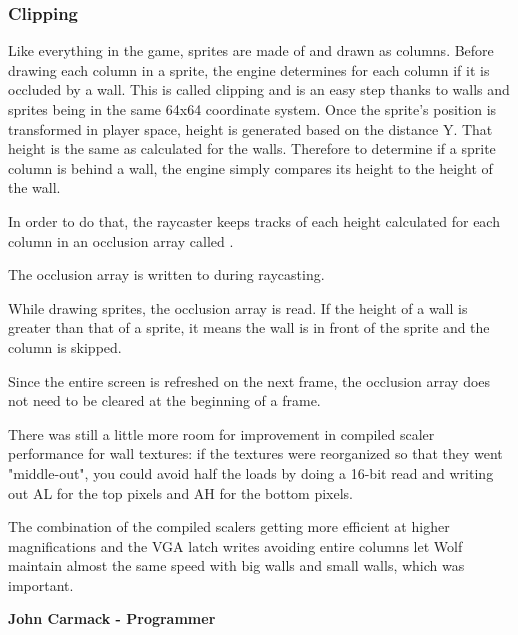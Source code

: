 \subsubsection{Clipping}
Like everything in the game, sprites are made of and drawn as columns. Before drawing each column in a sprite, the engine determines for each column if it is occluded by a wall. This is called clipping and is an easy step thanks to walls and sprites being in the same 64x64 coordinate system. Once the sprite's position is transformed in player space, height is generated based on the distance Y. That height is the same as calculated for the walls. Therefore to determine if a sprite column is behind a wall, the engine simply compares its height to the height of the wall.\\
\par
In order to do that, the raycaster keeps tracks of each height calculated for each column in an occlusion array called .\\
\par
\begin{minipage}{\textwidth}

\end{minipage}
\par
The occlusion array is written to during raycasting.\\
\par
\begin{minipage}{\textwidth}

\end{minipage}
While drawing sprites, the occlusion array is read. If the height of a wall is greater than that of a sprite, it means the wall is in front of the sprite and the column is skipped.\\
\par
\begin{minipage}{\textwidth}

\end{minipage}
\par
Since the entire screen is refreshed on the next frame, the occlusion array does not need to be cleared at the beginning of a frame.\\


\begin{fancyquotes}
There was still a little more room for improvement in compiled scaler performance for wall textures:  if the textures were reorganized so that they went "middle-out", you could avoid half the loads by doing a 16-bit read and writing out AL for the top pixels and AH for the bottom pixels.\\
\par 
The combination of the compiled scalers getting more efficient at higher magnifications and the VGA latch writes avoiding entire columns let Wolf maintain almost the same speed with big walls and small walls, which was important.\\
\par
\textbf{John Carmack - Programmer}
 \end{fancyquotes}


